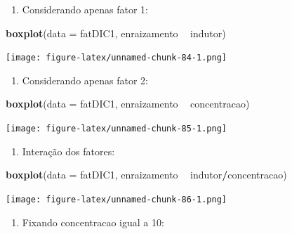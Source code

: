 \documentclass[
]{article}
\newenvironment{Shaded}{\begin{snugshade}}{\end{snugshade}}
\newcommand{\DataTypeTok}[1]{\textcolor[rgb]{0.13,0.29,0.53}{#1}}
\newcommand{\KeywordTok}[1]{\textcolor[rgb]{0.13,0.29,0.53}{\textbf{#1}}}
\newcommand{\NormalTok}[1]{#1}
\newcommand{\OperatorTok}[1]{\textcolor[rgb]{0.81,0.36,0.00}{\textbf{#1}}}
\newcommand{\StringTok}[1]{\textcolor[rgb]{0.31,0.60,0.02}{#1}}
\providecommand{\tightlist}{%
  \setlength{\itemsep}{0pt}\setlength{\parskip}{0pt}}
\begin{document}
\begin{enumerate}
\def\labelenumi{\arabic{enumi}.}
\tightlist
\item
  Considerando apenas fator 1:
\end{enumerate}

\begin{Shaded}
\begin{Highlighting}[]
\KeywordTok{boxplot}\NormalTok{(}\DataTypeTok{data =}\NormalTok{ fatDIC1, enraizamento }\OperatorTok{~}\StringTok{ }\NormalTok{indutor)}
\end{Highlighting}
\end{Shaded}

\texttt{[image: figure-latex/unnamed-chunk-84-1.png]}

\begin{enumerate}
\def\labelenumi{\arabic{enumi}.}
\setcounter{enumi}{1}
\tightlist
\item
  Considerando apenas fator 2:
\end{enumerate}

\begin{Shaded}
\begin{Highlighting}[]
\KeywordTok{boxplot}\NormalTok{(}\DataTypeTok{data =}\NormalTok{ fatDIC1, enraizamento }\OperatorTok{~}\StringTok{ }\NormalTok{concentracao)}
\end{Highlighting}
\end{Shaded}

\texttt{[image: figure-latex/unnamed-chunk-85-1.png]}

\begin{enumerate}
\def\labelenumi{\arabic{enumi}.}
\setcounter{enumi}{2}
\tightlist
\item
  Interação dos fatores:
\end{enumerate}

\begin{Shaded}
\begin{Highlighting}[]
\KeywordTok{boxplot}\NormalTok{(}\DataTypeTok{data =}\NormalTok{ fatDIC1, enraizamento }\OperatorTok{~}\StringTok{ }\NormalTok{indutor}\OperatorTok{/}\NormalTok{concentracao)}
\end{Highlighting}
\end{Shaded}

\texttt{[image: figure-latex/unnamed-chunk-86-1.png]}

\begin{enumerate}
\def\labelenumi{\arabic{enumi}.}
\setcounter{enumi}{3}
\tightlist
\item
  Fixando concentracao igual a 10:
\end{enumerate}
\end{document}
